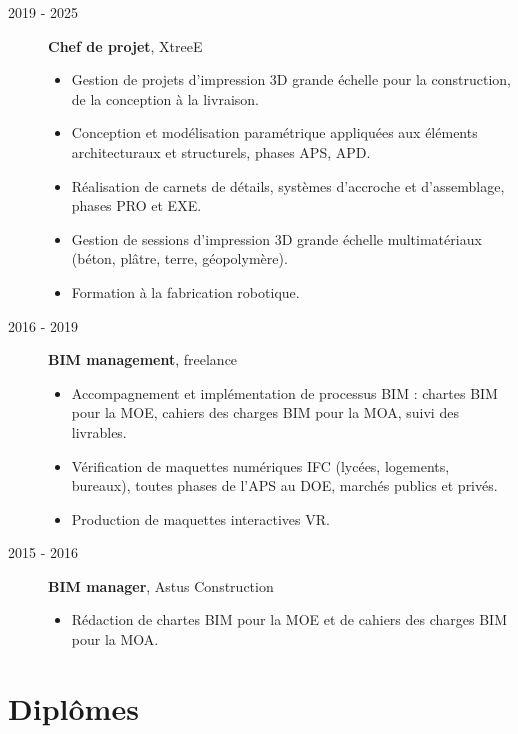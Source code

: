 \documentclass[11pt,a4paper]{article}
\begin{document}
\begin{description}
  \item[2019 - 2025] \textbf{Chef de projet}, XtreeE
  \begin{itemize}
    \item Gestion de projets d'impression 3D grande échelle pour la construction, de la conception à la livraison.
    \item Conception et modélisation paramétrique appliquées aux éléments architecturaux et structurels, phases APS, APD.
    \item Réalisation de carnets de détails, systèmes d'accroche et d'assemblage, phases PRO et EXE.
    \item Gestion de sessions d'impression 3D grande échelle multimatériaux (béton, plâtre, terre, géopolymère).
    \item Formation à la fabrication robotique.
  \end{itemize}

  \item[2016 - 2019] \textbf{BIM management}, freelance
  \begin{itemize}
    \item Accompagnement et implémentation de processus BIM : chartes BIM pour la MOE, cahiers des charges BIM pour la MOA, suivi des livrables.
    \item Vérification de maquettes numériques IFC (lycées, logements, bureaux), toutes phases de l'APS au DOE, marchés publics et privés.
    \item Production de maquettes interactives VR.
  \end{itemize}

  \item[2015 - 2016] \textbf{BIM manager}, Astus Construction
  \begin{itemize}
    \item Rédaction de chartes BIM pour la MOE et de cahiers des charges BIM pour la MOA.
  \end{itemize}
\end{description}

\section*{Diplômes}
\end{document}
